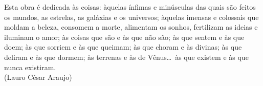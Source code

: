 
\begin{flushright}

\begin{minipage}[b]{8.9cm}
\vspace{17.01cm}
Esta obra é dedicada às coisas: àquelas ínfimas e minúsculas das quais são
feitos os mundos, as estrelas, as galáxias e os universos; àquelas imensas e
colossais que moldam a beleza, consomem a morte, alimentam os sonhos,
fertilizam as ideias e iluminam o amor; às coisas que são e às que não são; às
que sentem e às que doem; às que sorriem e às que queimam; às que choram e às
divinas; às que deliram e às que dormem; às terrenas e às de Vênus\ldots~às que
existem e às que nunca existiram.\\
(Lauro César Araujo)
\end{minipage}

\end{flushright}